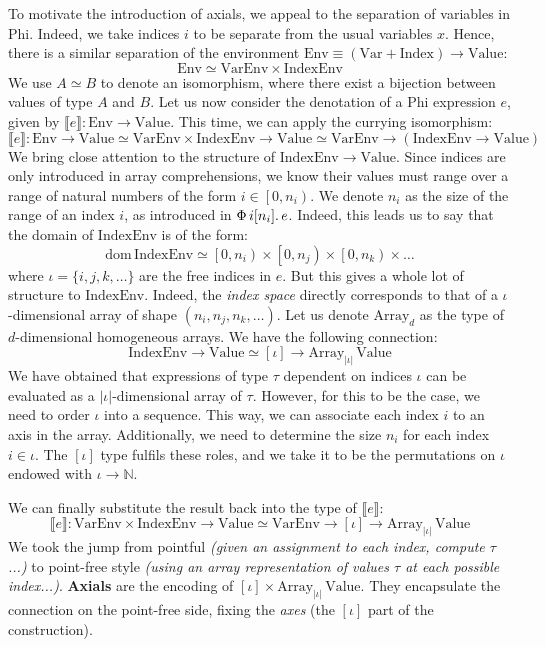 To motivate the introduction of axials, we appeal to the separation of variables in Phi. Indeed, we take indices $i$ to be separate from the usual variables $x$. Hence, there is a similar separation of the environment $\mathrm{Env} \equiv (\mathrm{Var} + \mathrm{Index}) \to \mathrm{Value}$:
$$ \mathrm{Env} \simeq \mathrm{VarEnv} \times \mathrm{IndexEnv} $$
We use $A \simeq B$ to denote an isomorphism, where there exist a bijection between values of type $A$ and $B$. Let us now consider the denotation of a Phi expression $e$, given by $\llbracket e \rrbracket : \mathrm{Env} \to \mathrm{Value}$. This time, we can apply the currying isomorphism:
$$\llbracket e \rrbracket : \mathrm{Env} \to \mathrm{Value} \simeq \mathrm{VarEnv} \times \mathrm{IndexEnv} \to \mathrm{Value} \simeq \mathrm{VarEnv} \to (\mathrm{IndexEnv} \to \mathrm{Value})$$
We bring close attention to the structure of $\mathrm{IndexEnv} \to \mathrm{Value}$. Since indices are only introduced in array comprehensions, we know their values must range over a range of natural numbers of the form $i \in \left[ 0, n_i \right)$. We denote $n_i$ as the size of the range of an index $i$, as introduced in $\Phi\, {i}[{n_i}] \ldotp {e}$. Indeed, this leads us to say that the domain of $\mathrm{IndexEnv}$ is of the form:
$$ \mathrm{dom}\,\mathrm{IndexEnv} \simeq \left[0, n_i \right) \times \left[0, n_j \right) \times \left[0, n_k \right) \times \dots $$ 
where $\iota = \{i, j, k, \dots \}$ are the free indices in $e$. But this gives a whole lot of structure to $\mathrm{IndexEnv}$. Indeed, the \textit{index space} directly corresponds to that of a $\iota$-dimensional array of shape $(n_i, n_j, n_k, \dots)$. Let us denote $\mathrm{Array}_d$ as the type of $d$-dimensional homogeneous arrays. We have the following connection:
$$ \mathrm{IndexEnv} \to \mathrm{Value} \simeq [\iota] \to \mathrm{Array}_{|\iota|}\, \mathrm{Value} $$
We have obtained that expressions of type $\tau$ dependent on indices $\iota$ can be evaluated as a $|\iota|$-dimensional array of $\tau$. However, for this to be the case, we need to order $\iota$ into a sequence. This way, we can associate each index $i$ to an axis in the array. Additionally, we need to determine the size $n_i$ for each index $i \in \iota$. The $[\iota]$ type fulfils these roles, and we take it to be the permutations on $\iota$ endowed with $\iota \to \mathbb N$.

We can finally substitute the result back into the type of $\llbracket e \rrbracket$:
$$ \boxed{ \llbracket e \rrbracket : \mathrm{VarEnv} \times \mathrm{IndexEnv} \to \mathrm{Value} \simeq \mathrm{VarEnv} \to  [\iota]  \to \mathrm{Array}_{|\iota|}\, \mathrm{Value} } $$
We took the jump from pointful \textit{(given an assignment to each index, compute $\tau$...)} to point-free style \textit{(using an array representation of values $\tau$ at each possible index...)}. \textbf{Axials} are the encoding of $[\iota] \times \mathrm{Array}_{|\iota|}\, \mathrm{Value}$. They encapsulate the connection on the point-free side, fixing the \textit{axes} (the $[\iota]$ part of the construction).

